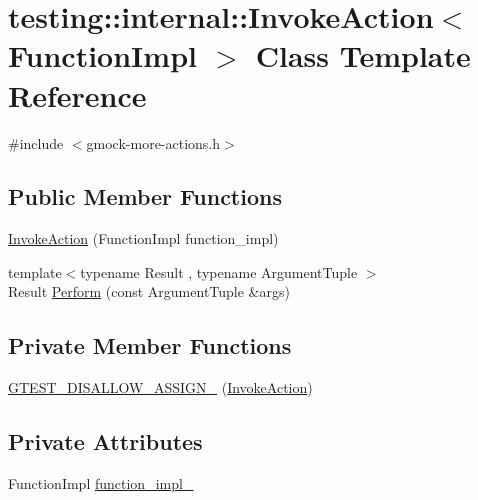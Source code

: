 \hypertarget{classtesting_1_1internal_1_1_invoke_action}{}\section{testing\+::internal\+::Invoke\+Action$<$ Function\+Impl $>$ Class Template Reference}
\label{classtesting_1_1internal_1_1_invoke_action}


{\ttfamily \#include $<$gmock-\/more-\/actions.\+h$>$}

\subsection*{Public Member Functions}
\begin{DoxyCompactItemize}
\item 
\mbox{\hyperlink{classtesting_1_1internal_1_1_invoke_action_a786ce772624fc87a31891f465df7ce61}{Invoke\+Action}} (Function\+Impl function\+\_\+impl)
\item 
{\footnotesize template$<$typename Result , typename Argument\+Tuple $>$ }\\Result \mbox{\hyperlink{classtesting_1_1internal_1_1_invoke_action_af357ce691795b3520de1fda4ab8af8b2}{Perform}} (const Argument\+Tuple \&args)
\end{DoxyCompactItemize}
\subsection*{Private Member Functions}
\begin{DoxyCompactItemize}
\item 
\mbox{\hyperlink{classtesting_1_1internal_1_1_invoke_action_a7fc4b4fad2b22e50dd818db00a8d7bb9}{G\+T\+E\+S\+T\+\_\+\+D\+I\+S\+A\+L\+L\+O\+W\+\_\+\+A\+S\+S\+I\+G\+N\+\_\+}} (\mbox{\hyperlink{classtesting_1_1internal_1_1_invoke_action}{Invoke\+Action}})
\end{DoxyCompactItemize}
\subsection*{Private Attributes}
\begin{DoxyCompactItemize}
\item 
Function\+Impl \mbox{\hyperlink{classtesting_1_1internal_1_1_invoke_action_afe2a9f6157cfd9c8b369987411f53337}{function\+\_\+impl\+\_\+}}
\end{DoxyCompactItemize}



